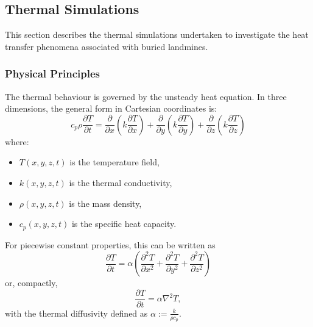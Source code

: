 \subsection{Thermal Simulations} \label{compvis_thermalsims}

    This section describes the thermal simulations undertaken to investigate the heat transfer phenomena associated with buried landmines.
    
    \subsubsection{Physical Principles}
    
    The thermal behaviour is governed by the unsteady heat equation. In three dimensions, the general form in Cartesian coordinates is:
    \begin{equation}
        c_p \rho \frac{\partial T}{\partial t} = 
        \frac{\partial}{\partial x} \left( k \frac{\partial T}{\partial x} \right) + 
        \frac{\partial}{\partial y} \left( k \frac{\partial T}{\partial y} \right) + 
        \frac{\partial}{\partial z} \left( k \frac{\partial T}{\partial z} \right)
    \end{equation}
    where:
    \begin{itemize}
        \item \( T(x,y,z,t) \) is the temperature field,
        \item \( k(x,y,z,t) \) is the thermal conductivity,
        \item \( \rho(x,y,z,t) \) is the mass density,
        \item \( c_p(x,y,z,t) \) is the specific heat capacity.
    \end{itemize}
    For piecewise constant properties, this can be written as
    \begin{equation}
        \frac{\partial T}{\partial t} = \alpha \left( \frac{\partial^2 T}{\partial x^2} + \frac{\partial^2 T}{\partial y^2} + \frac{\partial^2 T}{\partial z^2} \right)
    \end{equation}
    or, compactly,
    \begin{equation}
        \frac{\partial T}{\partial t} = \alpha \nabla^2 T,
    \end{equation}
    with the thermal diffusivity defined as \(\alpha := \frac{k}{\rho c_p}\).

    
    
